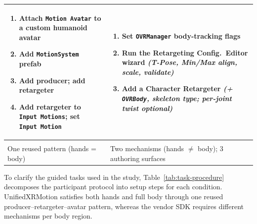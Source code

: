 \documentclass[runningheads]{llncs}
\newenvironment{cellsteps}
  {\begin{enumerate}[leftmargin=*,labelsep=0.4em,labelindent=0pt,
       topsep=0pt,partopsep=0pt,itemsep=1pt,parsep=0pt,label=\arabic*.]}
  {\end{enumerate}}
\begin{document}
\begin{table}[t]
\begin{tabularx}{\textwidth}{@{}>{\raggedright\arraybackslash}X >{\raggedright\arraybackslash}X@{}}
		\addlinespace[2pt]
		\begin{cellsteps}
		     \item Attach \texttt{Motion\,Avatar} to a custom humanoid avatar
		     \item Add \texttt{MotionSystem} prefab
		     \item Add producer; add retargeter
		     \item Add retargeter to \texttt{Input\,Motions}; set \texttt{Input\,Motion}
		   \end{cellsteps}
		 & \begin{cellsteps}
		     \item Set \texttt{OVRManager} body-tracking flags
		     \item Run the Retargeting Config.\ Editor wizard \textit{(T-Pose, Min/Max align, scale, validate)}
		     \item Add a Character Retargeter \textit{(+ \texttt{OVRBody}, skeleton type; per-joint twist optional)}
		   \end{cellsteps} \\
		\midrule
		\multicolumn{2}{@{}l}{\textbf{Pattern}} \\
		\addlinespace[2pt]
		One reused pattern (hands = body) & Two mechanisms (hands $\neq$ body); 3 authoring surfaces \\
		\bottomrule
	\end{tabularx}
\end{table}


	To clarify the guided tasks used in the study, Table~\ref{tab:task-procedure}
	decomposes the participant protocol into setup steps for each condition.
	UnifiedXRMotion satisfies both hands and full body through one reused
	producer--retargeter--avatar pattern, whereas the vendor SDK requires different
	mechanisms per body region.
\end{document}
